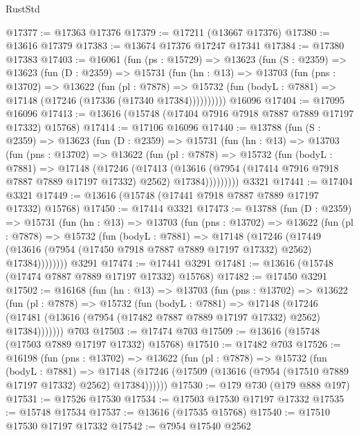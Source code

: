 \begin{lexlean}{RustStd}
\begin{coremodule}
@17377 := @17363 @17376
@17379 := @17211 (@13667 @17376)
@17380 := @13616 @17379
@17383 := @13674 @17376 @17247 @17341
@17384 := @17380 @17383
@17403 := @16061
    (fun (ps : @15729) =>
    @13623
      (fun (S : @2359) =>
      @13623
        (fun (D : @2359) =>
        @15731
          (fun (hn : @13) =>
          @13703
            (fun (pns : @13702) =>
            @13622
              (fun (pl : @7878) =>
              @15732 (fun (bodyL : @7881) => @17148 (@17246 (@17336 (@17340 @17384))))))))))
    @16096
@17404 := @17095 @16096
@17413 := @13616 (@15748 (@17404 @7916 @7918 @7887 @7889 @17197 @17332) @15768)
@17414 := @17106 @16096
@17440 := @13788
    (fun (S : @2359) =>
    @13623
      (fun (D : @2359) =>
      @15731
        (fun (hn : @13) =>
        @13703
          (fun (pns : @13702) =>
          @13622
            (fun (pl : @7878) =>
            @15732
              (fun (bodyL : @7881) =>
              @17148
                (@17246
                  (@17413
                    (@13616
                      (@7954 (@17414 @7916 @7918 @7887 @7889 @17197 @17332) @2562)
                      @17384)))))))))
    @3321
@17441 := @17404 @3321
@17449 := @13616 (@15748 (@17441 @7918 @7887 @7889 @17197 @17332) @15768)
@17450 := @17414 @3321
@17473 := @13788
    (fun (D : @2359) =>
    @15731
      (fun (hn : @13) =>
      @13703
        (fun (pns : @13702) =>
        @13622
          (fun (pl : @7878) =>
          @15732
            (fun (bodyL : @7881) =>
            @17148
              (@17246
                (@17449
                  (@13616 (@7954 (@17450 @7918 @7887 @7889 @17197 @17332) @2562) @17384))))))))
    @3291
@17474 := @17441 @3291
@17481 := @13616 (@15748 (@17474 @7887 @7889 @17197 @17332) @15768)
@17482 := @17450 @3291
@17502 := @16168
    (fun (hn : @13) =>
    @13703
      (fun (pns : @13702) =>
      @13622
        (fun (pl : @7878) =>
        @15732
          (fun (bodyL : @7881) =>
          @17148
            (@17246 (@17481 (@13616 (@7954 (@17482 @7887 @7889 @17197 @17332) @2562) @17384)))))))
    @703
@17503 := @17474 @703
@17509 := @13616 (@15748 (@17503 @7889 @17197 @17332) @15768)
@17510 := @17482 @703
@17526 := @16198
    (fun (pns : @13702) =>
    @13622
      (fun (pl : @7878) =>
      @15732
        (fun (bodyL : @7881) =>
        @17148 (@17246 (@17509 (@13616 (@7954 (@17510 @7889 @17197 @17332) @2562) @17384))))))
@17530 := @179 @730 (@179 @888 @197)
@17531 := @17526 @17530
@17534 := @17503 @17530 @17197 @17332
@17535 := @15748 @17534
@17537 := @13616 (@17535 @15768)
@17540 := @17510 @17530 @17197 @17332
@17542 := @7954 @17540 @2562

\end{coremodule}
\end{lexlean}
